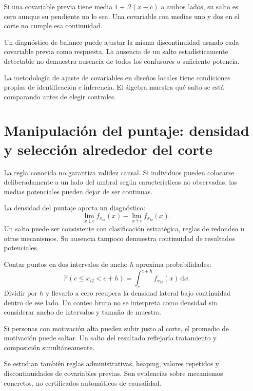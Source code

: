 \documentclass[11pt,a4paper]{article}
\newcommand{\Prob}{\mathbb P}
\newcommand{\dd}{\,\mathrm d}
\begin{document}
\begin{ejemplo}
Si una covariable previa tiene media
\(1+.2(x-c)\) a ambos lados,
su salto es cero aunque su pendiente no lo sea.
Una covariable con medias uno y dos
en el corte no cumple esa continuidad.
\end{ejemplo}
Un diagnóstico de balance puede ajustar
la misma discontinuidad usando cada
covariable previa como respuesta.
La ausencia de un salto estadísticamente detectable
no demuestra ausencia de todos los
confusores o suficiente potencia.

La metodología de ajuste de covariables
en diseños locales tiene condiciones
propias de identificación e inferencia.
El álgebra muestra qué salto se está
comparando antes de elegir controles.

\clearpage
\section{Manipulación del puntaje: densidad y selección alrededor del corte}\label{unidad39}
La regla conocida no garantiza validez causal.
Si individuos pueden colocarse deliberadamente
a un lado del umbral según características
no observadas, las medias potenciales
pueden dejar de ser continuas.

La densidad del puntaje aporta un diagnóstico:
\[
\lim_{x\downarrow c}f_{x_{i2}}(x)
-\lim_{x\uparrow c}f_{x_{i2}}(x).
\]
Un salto puede ser consistente con
clasificación estratégica, reglas de redondeo
u otros mecanismos.
Su ausencia tampoco demuestra
continuidad de resultados potenciales.

Contar puntos en dos intervalos
de ancho \(h\) aproxima probabilidades:
\[
\Prob(c\le x_{i2}<c+h)
=\int_c^{c+h}f_{x_{i2}}(x)\dd x.
\]
Dividir por \(h\) y llevarlo a cero
recupera la densidad lateral
bajo continuidad dentro de ese lado.
Un conteo bruto no se interpreta
como densidad sin considerar
ancho de intervalos y tamaño de muestra.

\begin{ejemplo}
Si personas con motivación alta
pueden subir justo al corte,
el promedio de motivación puede saltar.
Un salto del resultado reflejaría
tratamiento y composición simultáneamente.
\end{ejemplo}
Se estudian también reglas administrativas,
heaping, valores repetidos y discontinuidades
de covariables previas.
Son evidencias sobre mecanismos concretos,
no certificados automáticos de causalidad.
\end{document}
